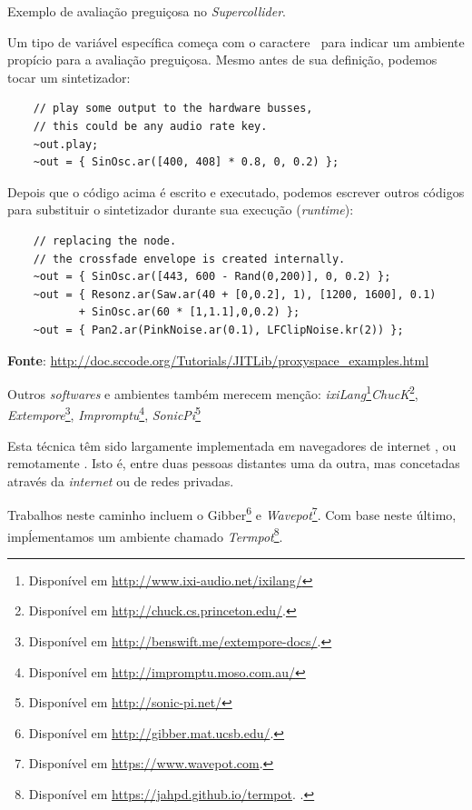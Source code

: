 \begin{example}{Exemplo de avaliação preguiçosa no \emph{Supercollider}.}

Um tipo de variável específica começa com o caractere $~$ para indicar um ambiente propício para a avaliação preguiçosa. Mesmo antes de sua definição, podemos tocar um sintetizador:

  \begin{verbatim}
    // play some output to the hardware busses,
    // this could be any audio rate key.
    ~out.play;
    ~out = { SinOsc.ar([400, 408] * 0.8, 0, 0.2) };
  \end{verbatim}

Depois que o código acima é escrito e executado, podemos escrever outros códigos para substituir o sintetizador durante sua execução (\emph{runtime}):
  
  \begin{verbatim}
    // replacing the node. 
    // the crossfade envelope is created internally.
    ~out = { SinOsc.ar([443, 600 - Rand(0,200)], 0, 0.2) };
    ~out = { Resonz.ar(Saw.ar(40 + [0,0.2], 1), [1200, 1600], 0.1) 
           + SinOsc.ar(60 * [1,1.1],0,0.2) };
    ~out = { Pan2.ar(PinkNoise.ar(0.1), LFClipNoise.kr(2)) };
  \end{verbatim}
    
  \textbf{Fonte}: \url{http://doc.sccode.org/Tutorials/JITLib/proxyspace_examples.html}
\label{cod:proxy}
\end{example}

Outros \emph{softwares} e ambientes também merecem menção: \emph{ixiLang}\footnote{Disponível em \url{http://www.ixi-audio.net/ixilang/}}\emph{ChucK}\footnote{Disponível em \url{http://chuck.cs.princeton.edu/}.}, \emph{Extempore}\footnote{Disponível em \url{http://benswift.me/extempore-docs/}.}, \emph{Impromptu}\footnote{Disponível em \url{http://impromptu.moso.com.au/}}, \emph{SonicPi}\footnote{Disponível em \url{http://sonic-pi.net/}}

Esta técnica têm sido largamente implementada em navegadores de internet \cite{roberts_web_2013}, ou remotamente \cite{junior_supercopair_2015}. Isto é, entre duas pessoas distantes uma da outra, mas concetadas através da \emph{internet} ou de redes privadas.

Trabalhos neste caminho incluem o Gibber\footnote{Disponível em \url{http://gibber.mat.ucsb.edu/}. } e \emph{Wavepot}\footnote{Disponível em \url{https://www.wavepot.com}.}. Com base neste último, impĺementamos um ambiente chamado \emph{Termpot}\footnote{Disponível em \url{https://jahpd.github.io/termpot}. .}.


